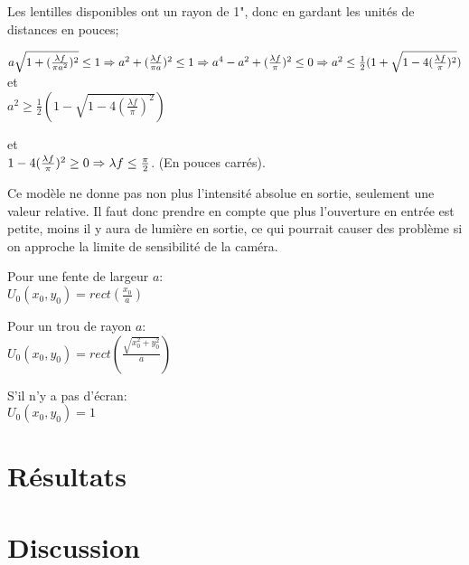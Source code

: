 \documentclass[11pt,letterpaper]{article}
\begin{document}
Les lentilles disponibles ont un rayon de 1", donc en gardant les unités de distances en pouces;

$
a\sqrt{1+(\frac{\lambda f}{\pi a^2})^2} \leq 1\\
\Rightarrow a^2+(\frac{\lambda f}{\pi a})^2 \leq 1 \\
\Rightarrow a^4-a^2+(\frac{\lambda f}{\pi})^2 \leq 0 \\
\Rightarrow
a^2 \leq \frac{1}{2}(1+\sqrt{1-4(\frac{\lambda f}{\pi})^2})\\
$
et \\
$a^2 \geq \frac{1}{2}(1-\sqrt{1-4(\frac{\lambda f}{\pi})^2})$

et \\
$1-4(\frac{\lambda f}{\pi})^2 \geq 0 \\
\Rightarrow \lambda f \leq \frac{\pi}{2}$. (En pouces carrés).


Ce modèle ne donne pas non plus l'intensité absolue en sortie, seulement une valeur relative. Il faut donc prendre en compte que plus l'ouverture en entrée est petite, moins il y aura de lumière en sortie, ce qui pourrait causer des problème si on approche la limite de sensibilité de la caméra.

Pour une fente de largeur $a$:\\ 
    $U_0(x_0,y_0)=rect(\frac{x_0}{a})$

Pour un trou de rayon $a$:\\ 
    $U_0(x_0,y_0)=rect(\frac{\sqrt{x_0^2+y_0^2}}{a})$

S'il n'y a pas d'écran: \\
    $U_0(x_0,y_0)=1$

\section{Résultats}

\section{Discussion}


\end{document}

